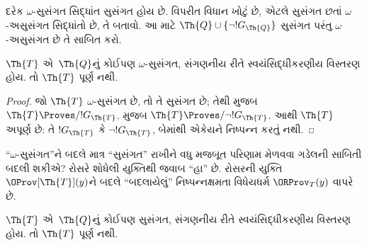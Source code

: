 \begin{prob}
  દરેક $\omega$-સુસંગત
  સિદ્ધાંત સુસંગત હોય છે.
  વિપરીત વિધાન ખોટું છે,
  એટલે સુસંગત છતાં
  $\omega$-અસુસંગત
  સિદ્ધાંતો છે, તે બતાવો.
  આ માટે $\Th{Q} \cup
  \{\lnot !G_\Th{Q}\}$
  સુસંગત પરંતુ
  $\omega$-અસુસંગત છે
  તે સાબિત કરો.
\end{prob}

\begin{thm}
$\Th{T}$ એ~$\Th{Q}$નું
કોઈપણ $\omega$-સુસંગત,
સંગણનીય રીતે સ્વયંસિદ્ધીકરણીય વિસ્તરણ
હોય. તો $\Th{T}$ પૂર્ણ
નથી.
\end{thm}

\begin{proof}
  જો $\Th{T}$
  $\omega$-સુસંગત છે,
  તો તે સુસંગત છે; તેથી
  મુજબ $\Th{T}
  \Proves/ !G_\Th{T}$.
  મુજબ
  $\Th{T} \Proves/ \lnot !G_\Th{T}$.
  આથી $\Th{T}$ અપૂર્ણ
  છે: તે $!G_\Th{T}$
  કે $\lnot !G_\Th{T}$,
  બેમાંથી એકેયને
  નિષ્પન્ન કરતું નથી.
\end{proof}
\endgroup


\begingroup
\makeatletter{}\makeatother


\label{guunit:OLP-0316}


``$\omega$-સુસંગત''ને
બદલે માત્ર ``સુસંગત''
રાખીને વધુ મજબૂત
પરિણામ મેળવવા ગડેલની
સાબિતી બદલી શકીએ?
રોસરે શોધેલી યુક્તિથી
જવાબ ``હા'' છે.
રોસરની યુક્તિ
$\OProv[\Th{T}](y)$ને
બદલે ``બદલાયેલું''
નિષ્પન્નક્ષમતા વિધેયધર્મ
$\ORProv_T(y)$ વાપરે છે.

\begin{thm}
$\Th{T}$ એ~$\Th{Q}$નું
કોઈપણ સુસંગત,
સંગણનીય રીતે સ્વયંસિદ્ધીકરણીય વિસ્તરણ
હોય. તો $\Th{T}$
પૂર્ણ નથી.
\end{thm}

